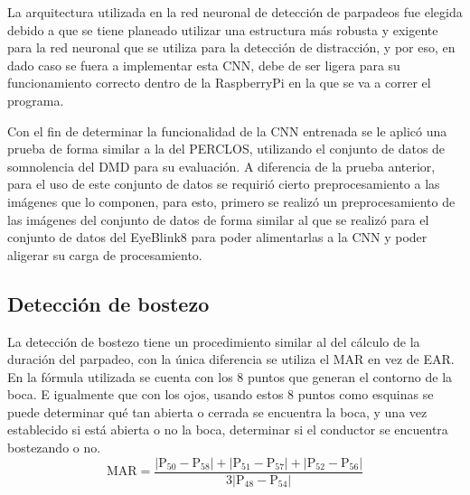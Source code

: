 La arquitectura utilizada en la red neuronal de detección de parpadeos fue elegida debido a que se tiene planeado utilizar una estructura más robusta y exigente para la red neuronal que se utiliza para la detección de distracción, y por eso, en dado caso se fuera a implementar esta CNN, debe de ser ligera para su funcionamiento correcto dentro de la RaspberryPi en la que se va a correr el programa.

Con el fin de determinar la funcionalidad de la CNN entrenada se le aplicó una prueba de forma similar a la del PERCLOS, utilizando el conjunto de datos de somnolencia del DMD para su evaluación. A diferencia de la prueba anterior, para el uso de este conjunto de datos se requirió cierto preprocesamiento a las imágenes que lo componen, para esto, primero se realizó un preprocesamiento de las imágenes del conjunto de datos de forma similar al que se realizó para el conjunto de datos del EyeBlink8 para poder alimentarlas a la CNN y poder aligerar su carga de procesamiento.

\subsection{Detección de bostezo}
La detección de bostezo tiene un procedimiento similar al del cálculo de la duración del parpadeo, con la única diferencia se utiliza el MAR en vez de EAR. En la fórmula utilizada se cuenta con los 8 puntos que generan el contorno de la boca. E igualmente que con los ojos, usando estos 8 puntos como esquinas se puede determinar qué tan abierta o cerrada se encuentra la boca, y una vez establecido si está abierta o no la boca, determinar si el conductor se encuentra bostezando o no. 
\[
\mathrm{MAR} = \frac{|\mathrm{P}_{50} - \mathrm{P}_{58}| + |\mathrm{P}_{51} - \mathrm{P}_{57}| + |\mathrm{P}_{52} - \mathrm{P}_{56}|}{3|\mathrm{P}_{48} - \mathrm{P}_{54}|}
\]

